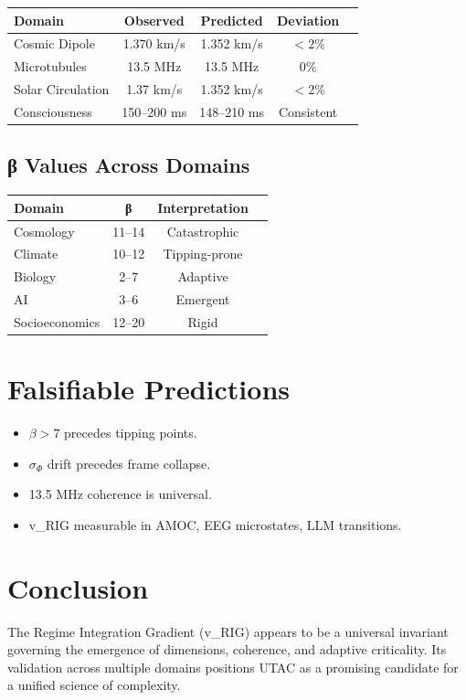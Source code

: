 \documentclass[11pt,a4paper]{article}
\begin{document}
\begin{table}[h!]
\centering
\begin{tabular}{lcccc}
\toprule
Domain & Observed & Predicted & Deviation \\
\midrule
Cosmic Dipole & 1.370 km/s & 1.352 km/s & $<2\%$ \\
Microtubules & 13.5 MHz & 13.5 MHz & $0\%$ \\
Solar Circulation & 1.37 km/s & 1.352 km/s & $<2\%$ \\
Consciousness & 150--200 ms & 148--210 ms & Consistent \\
\bottomrule
\end{tabular}
\end{table}

\subsection{β Values Across Domains}

\begin{table}[h!]
\centering
\begin{tabular}{lccc}
\toprule
Domain & β & Interpretation \\
\midrule
Cosmology & 11--14 & Catastrophic \\
Climate & 10--12 & Tipping-prone \\
Biology & 2--7 & Adaptive \\
AI & 3--6 & Emergent \\
Socioeconomics & 12--20 & Rigid \\
\bottomrule
\end{tabular}
\end{table}

\section{Falsifiable Predictions}

\begin{itemize}
\item $\beta > 7$ precedes tipping points.
\item $\sigma_{\Phi}$ drift precedes frame collapse.
\item 13.5 MHz coherence is universal.
\item v\_RIG measurable in AMOC, EEG microstates, LLM transitions.
\end{itemize}

\section{Conclusion}

The Regime Integration Gradient (v\_RIG) appears to be a universal invariant governing the emergence of dimensions, coherence, and adaptive criticality. Its validation across multiple domains positions UTAC as a promising candidate for a unified science of complexity.
\end{document}
